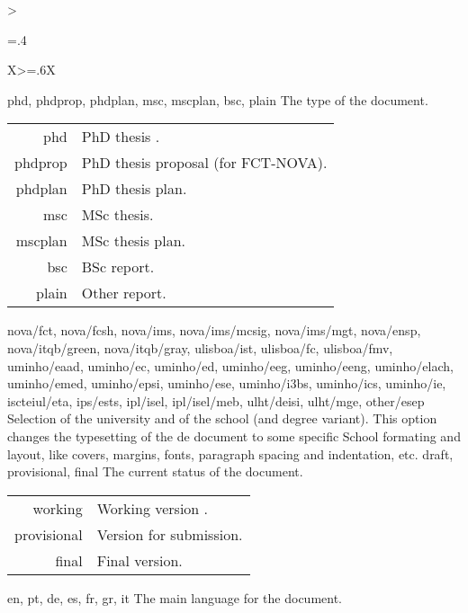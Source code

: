 \bgroup
\begin{xltabular}{\linewidth}{>{\hsize=.4\hsize\raggedright\arraybackslash}X>{\hsize=.6\hsize}X}
  \toprule
    {phd, phdprop, phdplan, msc, mscplan, bsc, plain}%
    {The type of the document.}%
	{%
    \begin{tabular}{@{}r@{ $\rightarrow$ }l@{}}
        phd & PhD thesis .\\
    phdprop & PhD thesis proposal (for FCT-NOVA).\\
    phdplan & PhD thesis plan.\\
        msc & MSc thesis.\\
    mscplan & MSc thesis plan.\\
        bsc & BSc report.\\
      plain & Other report.\\
    \end{tabular}
    }
    \midrule
  	{nova/fct, nova/fcsh, nova/ims, nova/ims/mcsig, nova/ims/mgt, nova/ensp, nova/itqb/green, nova/itqb/gray,
ulisboa/ist, ulisboa/fc, ulisboa/fmv,
uminho/eaad, uminho/ec, uminho/ed, uminho/eeg, uminho/eeng, uminho/elach, uminho/emed, uminho/epsi, uminho/ese, uminho/i3bs, uminho/ics, uminho/ie, 
iscteiul/eta, 
ips/ests, 
ipl/isel, ipl/isel/meb,
ulht/deisi, ulht/mge, 
other/esep
	}%
    {Selection of the university and of the school (and degree variant).}%
    { 
     This option changes the typesetting of the de document to some specific School formating and layout, like covers, margins, fonts, paragraph spacing and indentation, etc.}
    \midrule
    {draft, provisional, final}%
    {The current status of the document.}%
	{%
    \begin{tabular}{@{}r@{ $\rightarrow$ }X@{}}
         working      & Working version .\\
         provisional  & Version for submission.\\
         final        & Final version.\\
    \end{tabular}
    }
    \midrule
    {en, pt, de, es, fr, gr, it}%
    {The main language for the document.}%
	{%
    \begin{tabular}{@{}l@{ $\rightarrow$ }X@{}}

\end{tabular}}
\end{xltabular}
